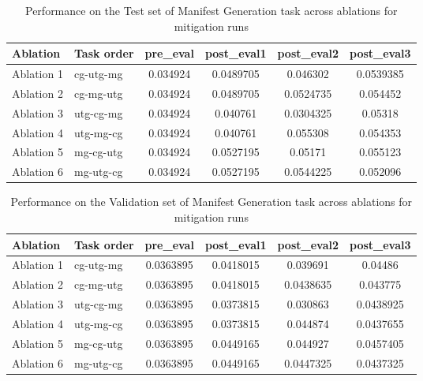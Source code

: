 \begin{table}[!ht]
    \centering
    \caption{Performance on the Test set of Manifest Generation task across ablations for mitigation runs}
    \begin{tabular}{|l|l|S[table-format=2.4]|S[table-format=2.4]|S[table-format=2.4]|S[table-format=2.4]|}
    \hline
        \textbf{Ablation} & \textbf{Task order} & \textbf{pre\_eval} & \textbf{post\_eval1} & \textbf{post\_eval2} & \textbf{post\_eval3 } \\ \hline
        Ablation 1 & cg-utg-mg & 0.034924 & 0.0489705 & 0.046302 & 0.0539385  \\ 
        Ablation 2 & cg-mg-utg & 0.034924 & 0.0489705 & 0.0524735 & 0.054452  \\ 
        Ablation 3 & utg-cg-mg & 0.034924 & 0.040761 & 0.0304325 & 0.05318  \\ 
        Ablation 4 & utg-mg-cg & 0.034924 & 0.040761 & 0.055308 & 0.054353  \\ 
        Ablation 5 & mg-cg-utg & 0.034924 & 0.0527195 & 0.05171 & 0.055123  \\ 
        Ablation 6 & mg-utg-cg & 0.034924 & 0.0527195 & 0.0544225 & 0.052096 \\ \hline
    \end{tabular}
    \label{tab:ManifestGenTestMitigation}
\end{table}

\begin{table}[!ht]
    \centering
    \caption{Performance on the Validation set of Manifest Generation task across ablations for mitigation runs}
    \begin{tabular}{|l|l|S[table-format=2.4]|S[table-format=2.4]|S[table-format=2.4]|S[table-format=2.4]|}
    \hline
        \textbf{Ablation} & \textbf{Task order} & \textbf{pre\_eval} & \textbf{post\_eval1} & \textbf{post\_eval2} & \textbf{post\_eval3 } \\ \hline
        Ablation 1 & cg-utg-mg & 0.0363895 & 0.0418015 & 0.039691 & 0.04486  \\ 
        Ablation 2 & cg-mg-utg & 0.0363895 & 0.0418015 & 0.0438635 & 0.043775  \\ 
        Ablation 3 & utg-cg-mg & 0.0363895 & 0.0373815 & 0.030863 & 0.0438925  \\ 
        Ablation 4 & utg-mg-cg & 0.0363895 & 0.0373815 & 0.044874 & 0.0437655  \\ 
        Ablation 5 & mg-cg-utg & 0.0363895 & 0.0449165 & 0.044927 & 0.0457405  \\ 
        Ablation 6 & mg-utg-cg & 0.0363895 & 0.0449165 & 0.0447325 & 0.0437325 \\ \hline
    \end{tabular}
    \label{tab:ManifestGenValMitigation}
\end{table}